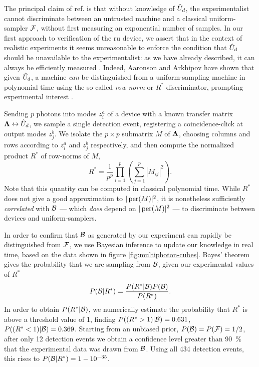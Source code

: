 The principal claim of ref. \cite{Gogolin2013} is that without knowledge of $\hat{U}_d$, the experimentalist cannot discriminate between an untrusted \bosonsampling machine and a classical uniform-sampler  $\mathcal{F}$,  without first measuring an exponential number of samples.  In our first approach to verification of the \gls{ru} device, we assert that in the context of realistic experiments it seems unreasonable to enforce the condition that $\hat{U}_d$ should be unavailable to the experimentalist: as we have already described, it can always be efficiently measured \cite{Laing2012a}. Indeed, Aaronson and Arkhipov have shown \cite{Aaronson2013} that given $\hat{U}_d$, a \bosonsampling machine \emph{can} be distinguished from a uniform-sampling machine in polynomial time using the so-called \emph{row-norm} or $R^*$ discriminator, prompting experimental interest \cite{Spagnolo2013a}.

Sending $p$ photons into modes $z^a_i$ of a device with a known transfer matrix $\mathbf{\Lambda} \leftrightarrow \hat{U}_d$, we sample a single detection event, registering a coincidence-click at output modes $z^b_j$. We isolate the $p \times p$ submatrix $M$ of $\mathbf{\Lambda}$, choosing columns and rows according to $z^a_i$ and $z^b_j$ respectively, and then compute the normalized product $R^*$ of row-norms of $M$,
\begin{equation}
R^*= \frac{1}{p^p}\prod_{i=1}^p \left( \sum_{j=1}^p |M_{ij}|^2 \right).
\end{equation}
Note that this quantity can be computed in classical polynomial time. While $R^*$ does not give a good approximation to $|\,\mathrm{per}(M)|^2$, it is nonetheless sufficiently \emph{correlated} with $\mathcal{B}$ --- which \emph{does} depend on $|\,\mathrm{per}(M)|^2$ --- to discriminate between \bosonsampling devices and uniform-samplers. 

In order to confirm that $\mathcal{B}$ as generated by our experiment can rapidly be distinguished from $\mathcal{F}$, we use Bayesian inference to update our knowledge in real time, based on the data shown in figure \ref{fig:multiphoton-cubes}. Bayes' theorem gives the probability that we are sampling from $\mathcal{B}$, given our experimental values of $R^*$
\begin{equation}
   P(\mathcal{B} | R^*) = \frac{P(R^*|\mathcal{B}) P(\mathcal{B})}{P(R^*)}.
\end{equation}
In order to obtain $P(R^*|\mathcal{B})$, we numerically estimate the probability that $R^*$ is above a threshold value of 1, finding $P((R^*>1)|\mathcal{B})=0.631$, $P((R^*<1)|\mathcal{B})=0.369$.
Starting from an unbiased prior, $P(\mathcal{B}) = P(\mathcal{F}) = 1/2$, after only 12 detection events we obtain a confidence level greater than \SI{90}{\percent} that the experimental data was drawn from $\mathcal{B}$. Using all 434 detection events, this rises to $P(\mathcal{B}|R^*) = 1-10^{-35}$.

